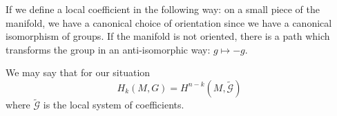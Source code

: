 If we define a local coefficient in the following way: on a small
piece of the manifold, we have a canonical choice of orientation
since we have a canonical isomorphism of groups. If the manifold
is not oriented, there is a path which transforms the group in an
anti-isomorphic way: $g\mapsto-g$.

We may say that for our situation
\begin{equation}
H_{k}(M,G)=H^{n-k}(M,\widetilde{\mathscr{G}})
\end{equation}
where $\widetilde{\mathscr{G}}$ is the local system of coefficients.
